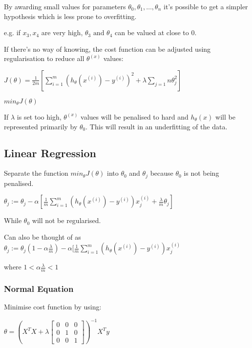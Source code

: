 \documentclass[12pt, a4paper]{article}
\begin{document}
    By awarding small values for parameters $\theta_0,\theta_1,\dots,\theta_n$
    it's possible to get a simpler hypothesis which is less prone to 
    overfitting.

    e.g. if $x_3, x_4$ are very high, $\theta_3 \text{ and } \theta_4$ can
    be valued at close to 0. 

    If there's no way of knowing, the cost function can be adjusted using
    regularisation to reduce all $\theta^{(x)}$ values:

    $J(\theta) = \frac{1}{2m} [\displaystyle\sum_{i=1}^m 
    (h_\theta(x^{(i)}) - y^{(i)})^2 + \lambda \displaystyle\sum_{j=1}{n} 
    \theta_j^2]$

    $min_\theta J(\theta)$

    If $\lambda$ is set too high, $\theta^{(x)}$ values will be penalised to
    hard and $h_\theta(x)$ will be represented primarily by $\theta_0$. This
    will result in an underfitting of the data. 

  \subsection{Linear Regression}

    Separate the function $min_\theta J(\theta)$ into $\theta_0$ and $\theta_j$
    because $\theta_0$ is not being penalised.

    $\theta_j := \theta_j - \alpha [ \frac{1}{m} \displaystyle\sum_{i=1}^m
    (h_\theta(x^{(i)}) - y^{(i)})x_j^{(i)} + \frac{\lambda}{m}\theta_j]$

    While $\theta_0$ will not be regularised. 

    Can also be thought of as $\theta_j := \theta_j(1-\alpha\frac{\lambda}{m})
    - \alpha [ \frac{1}{m} \displaystyle\sum_{i=1}^m (h_\theta(x^{(i)}) - 
    y^{(i)})x_j^{(i)}$ 

    where $1 < \alpha\frac{\lambda}{m} < 1$

    \subsubsection{Normal Equation}

      Minimise cost function by using:

      $\theta = (X^TX + \lambda \begin{bmatrix} 0 & 0 & 0 \\  0 & 1 & 0 \\
      0 & 0 & 1 \end{bmatrix}) ^{-1} X^Ty$
\end{document}
